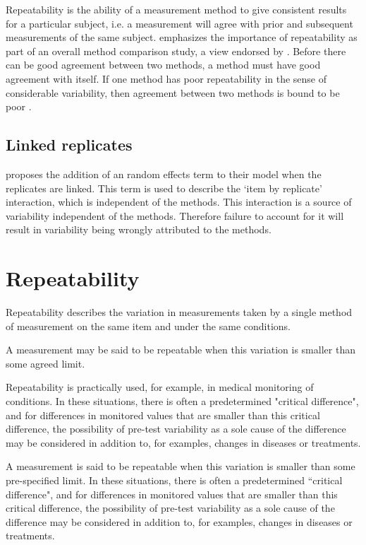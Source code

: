 \documentclass[12pt, a4paper]{report}
\theoremstyle{plain}
\theoremstyle{definition}
\theoremstyle{remark}
\begin{document}
	
	
	
	
	
	
	Repeatability is the ability of a measurement method to give consistent results for a particular subject, i.e. a measurement will agree with prior and subsequent measurements of the same subject. \citet{Barnhart} emphasizes the importance of repeatability as part of an overall method comparison study, a view endorsed by \citet{BXC2008}. Before there can be good agreement between two methods, a method must have good agreement with itself. If one method has poor repeatability in the sense of considerable
	variability, then agreement between two methods is bound to be
	poor \citep{ARoy2009}. 
	
	
	
	
	
	
	
	
	\subsection{Linked replicates}
	
	\citet{BXC2008} proposes the addition of an random effects term to their model when the replicates are linked. This term is used to describe the `item by replicate' interaction, which is independent of the methods. This interaction is a source of variability independent of the methods. Therefore failure to account for it will result in variability being wrongly attributed to the methods.
	
	
	
	
	\section{Repeatability }
Repeatability describes the variation in measurements taken by a single method of measurement on the same item and under the same conditions. 
 
A measurement may be said to be repeatable when this variation is smaller than some agreed limit.

Repeatability is practically used, for example, in medical monitoring of conditions. In these situations, there is often a predetermined "critical difference", and for differences in monitored values that are smaller than this critical difference, the possibility of pre-test variability as a sole cause of the difference may be considered in addition to, for examples, changes in diseases or treatments.

A measurement is said to be repeatable when this variation is smaller than some pre-specified limit. In these situations, there is often a predetermined ``critical difference", and for differences in monitored values that are smaller than this critical difference, the possibility of pre-test variability as a sole cause of the difference may be considered in addition to, for examples, changes in diseases or treatments. 
		
\end{document}
